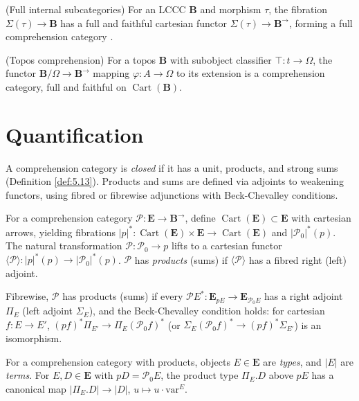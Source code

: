 \documentclass{article}
\begin{document}
\begin{example}
\label{ex:4.6}
(Full internal subcategories) For an LCCC $\mathbf{B}$ and morphism $\tau$, the fibration $\Sigma(\tau) \to \mathbf{B}$ has a full and faithful cartesian functor $\Sigma(\tau) \to \mathbf{B}^{\to}$, forming a full comprehension category \cite{Pitts1987, Johnstone1977}.
\end{example}

\begin{example}
\label{ex:4.7}
(Topos comprehension) For a topos $\mathbf{B}$ with subobject classifier $\top : t \to \Omega$, the functor $\mathbf{B}/\Omega \to \mathbf{B}^{\to}$ mapping $\varphi : A \to \Omega$ to its extension is a comprehension category, full and faithful on $\operatorname{Cart}(\mathbf{B})$.
\end{example}

\newpage
\section{Quantification}
\label{sec:quantification}

A comprehension category is \emph{closed} if it has a unit, products, and strong sums (Definition \ref{def:5.13}). Products and sums are defined via adjoints to weakening functors, using fibred or fibrewise adjunctions with Beck-Chevalley conditions.

For a comprehension category $\mathscr{P} : \mathbf{E} \to \mathbf{B}^{\to}$, define $\operatorname{Cart}(\mathbf{E}) \subset \mathbf{E}$ with cartesian arrows, yielding fibrations $|p|^* : \operatorname{Cart}(\mathbf{E}) \times \mathbf{E} \to \operatorname{Cart}(\mathbf{E})$ and $|\mathscr{P}_0|^*(p)$. The natural transformation $\mathscr{P} : \mathscr{P}_0 \to p$ lifts to a cartesian functor $\langle \mathscr{P} \rangle : |p|^*(p) \to |\mathscr{P}_0|^*(p)$. $\mathscr{P}$ has \emph{products} (sums) if $\langle \mathscr{P} \rangle$ has a fibred right (left) adjoint.

Fibrewise, $\mathscr{P}$ has products (sums) if every $\mathscr{P} E^* : \mathbf{E}_{p E} \to \mathbf{E}_{\mathscr{P}_0 E}$ has a right adjoint $\Pi_E$ (left adjoint $\Sigma_E$), and the Beck-Chevalley condition holds: for cartesian $f : E \to E'$, $(p f)^* \Pi_{E'} \to \Pi_E (\mathscr{P}_0 f)^*$ (or $\Sigma_E (\mathscr{P}_0 f)^* \to (p f)^* \Sigma_{E'}$) is an isomorphism.

\begin{definition}
\label{def:5.1}
For a comprehension category with products, objects $E \in \mathbf{E}$ are \emph{types}, and $|E|$ are \emph{terms}. For $E, D \in \mathbf{E}$ with $p D = \mathscr{P}_0 E$, the product type $\Pi_E . D$ above $p E$ has a canonical map $|\Pi_E . D| \to |D|$, $u \mapsto u \cdot \text{var}^E$.
\end{definition}
\end{document}
